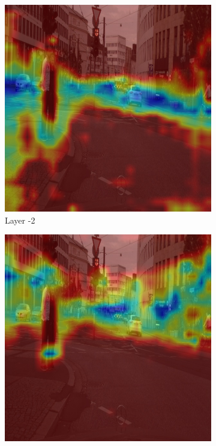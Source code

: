 \begin{figure}[h]
    \centering


    \begin{subfigure}[b]{0.24\textwidth}
        \centering
        \includegraphics[width=\textwidth]{figures/bonn_000035_000019_leftImg8bit.pnglayer-2/bonn_000035_000019_leftImg8bit.png_object(0)_heatmap}
        \caption{Layer -2}
        \label{fig:a-2}
    \end{subfigure}
    \hfill
    \begin{subfigure}[b]{0.24\textwidth}
        \centering
        \includegraphics[width=\textwidth]{figures/bonn_000035_000019_leftImg8bit.pnglayer-3/bonn_000035_000019_leftImg8bit.png_object(0)_heatmap}

\end{subfigure}
\end{figure}
